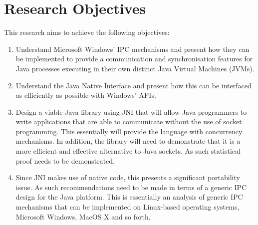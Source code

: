 \documentclass[12pt] {newrucsthesis}    %
\begin{document}
    \section{Research Objectives} \label{researchobjectives}
      This research aims to achieve the following objectives:
      \begin{enumerate}
        \item Understand Microsoft Windows' IPC mechanisms and present how they can be implemented to provide a communication
              and synchronisation features for Java processes executing in their own distinct Java Virtual Machines (JVMs).

        \item Understand the Java Native Interface and present how this can be interfaced as efficiently as possible with
              Windows' APIs.

        \item Design a viable Java library using JNI that will allow Java programmers to write applications that are able to
              communicate without the use of socket programming. This essentially will provide the
              language with concurrency mechanisms. In addition, the library will need to demonstrate that
              it is a more efficient and effective alternative to Java sockets. As such statistical proof needs to be
              demonstrated.

        \item Since JNI makes use of native code, this presents a significant portability issue. As such recommendations
              need to be made in terms of a generic IPC design for the Java platform. This is essentially an analysis of
              generic IPC mechanisms that can be implemented on Linux-based operating systems, Microsoft Windows, MacOS X
              and so forth.
      \end{enumerate}
\end{document}
